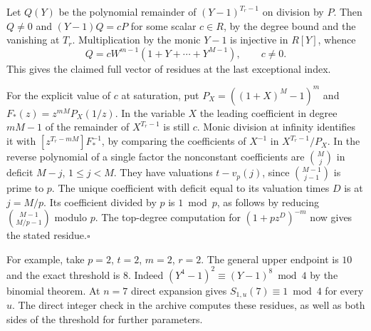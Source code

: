 Let $Q(Y)$ be the polynomial remainder of $(Y-1)^{T_r-1}$ on division by $P$. Then $Q\ne0$ and $(Y-1)Q= cP$ for some scalar $c\in R$, by the degree bound and the vanishing at $T_r$. Multiplication by the monic $Y-1$ is injective in $R[Y]$, whence
\[
 Q=cW^{m-1}(1+Y+\cdots+Y^{M-1}),\qquad c\ne0 .
\]
This gives the claimed full vector of residues at the last exceptional index.

For the explicit value of $c$ at saturation, put $P_X=((1+X)^M-1)^m$ and $F_*(z)=z^{mM}P_X(1/z)$. In the variable $X$ the leading coefficient in degree $mM-1$ of the remainder of $X^{T_r-1}$ is still $c$. Monic division at infinity identifies it with $[z^{T_r-mM}]F_*^{-1}$, by comparing the coefficients of $X^{-1}$ in $X^{T_r-1}/P_X$. In the reverse polynomial of a single factor the nonconstant coefficients are $\binom Mj$ in deficit $M-j$, $1\le j<M$. They have valuations $t-v_p(j)$, since $\binom{M-1}{j-1}$ is prime to $p$. The unique coefficient with deficit equal to its valuation times $D$ is at $j=M/p$. Its coefficient divided by $p$ is $1\bmod p$, as follows by reducing $\binom{M-1}{M/p-1}$ modulo $p$. The top-degree computation for $(1+pz^D)^{-m}$ now gives the stated residue.\hfill$\square$

For example, take $p=2$, $t=2$, $m=2$, $r=2$. The general upper endpoint is $10$ and the exact threshold is $8$. Indeed $(Y^4-1)^2\equiv(Y-1)^8\bmod4$ by the binomial theorem. At $n=7$ direct expansion gives $S_{1,u}(7)\equiv1\bmod4$ for every $u$. The direct integer check in the archive computes these residues, as well as both sides of the threshold for further parameters.
